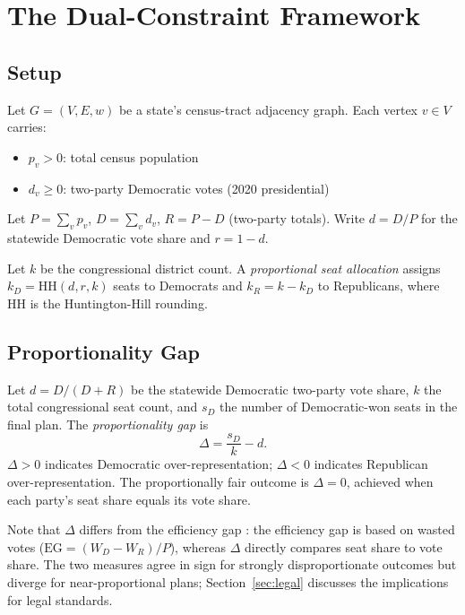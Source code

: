 \section{The Dual-Constraint Framework}
\label{sec:framework}

\subsection{Setup}

Let $G = (V, E, w)$ be a state's census-tract adjacency graph.
Each vertex $v \in V$ carries:
\begin{itemize}
  \item $p_v > 0$: total census population
  \item $d_v \geq 0$: two-party Democratic votes (2020 presidential)
\end{itemize}

Let $P = \sum_v p_v$, $D = \sum_v d_v$, $R = P - D$ (two-party totals).
Write $d = D/P$ for the statewide Democratic vote share and $r = 1 - d$.

Let $k$ be the congressional district count.
A \emph{proportional seat allocation} assigns $k_D = \mathrm{HH}(d, r, k)$
seats to Democrats and $k_R = k - k_D$ to Republicans, where $\mathrm{HH}$
is the Huntington-Hill rounding.

\subsection{Proportionality Gap}

\begin{definition}
\label{def:pgap}
Let $d = D/(D+R)$ be the statewide Democratic two-party vote share, $k$ the
total congressional seat count, and $s_D$ the number of Democratic-won seats
in the final plan.
The \emph{proportionality gap} is
\[
  \Delta = \frac{s_D}{k} - d.
\]
$\Delta > 0$ indicates Democratic over-representation; $\Delta < 0$ indicates
Republican over-representation.
The proportionally fair outcome is $\Delta = 0$, achieved when each party's
seat share equals its vote share.
\end{definition}

\noindent Note that $\Delta$ differs from the efficiency gap \citep{mcghee2014measuring}:
the efficiency gap is based on wasted votes ($\text{EG} = (W_D - W_R)/P$),
whereas $\Delta$ directly compares seat share to vote share.
The two measures agree in sign for strongly disproportionate outcomes but
diverge for near-proportional plans; Section~\ref{sec:legal} discusses the
implications for legal standards.

